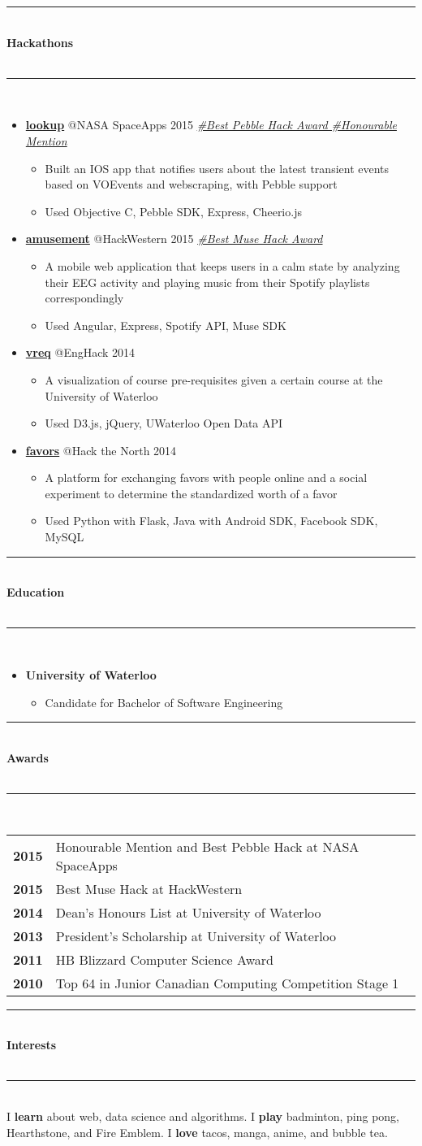 \documentclass[10pt]{article}
\makeatletter
\newcommand{\cvsectiontitle}[1]{%
	\rule{\linewidth}{0.2mm}\\%
		{\large\indent\textbf{#1}}\\%
	\\[-6.5mm]\rule{\linewidth}{0.2mm}\\[2mm]%
	}
\newcommand{\cvhackathonproject}[4]{\href{#2}{\textbf{#1}} @{#3} \color{BrickRed}\textit{#4} \color{Black}}
\newcommand{\cveducation}[2]{\textbf{#1} \hspace{\stretch{3}}{#2}}
\newcommand{\cvaward}[2]{\textbf{#1} & {#2}}
\newcommand{\cvsublevel}[1]{\begin{itemize}[leftmargin=0.5cm] #1\end{itemize}}
\newcommand{\cvsubbullet}[1]{\vspace{-1mm}\item #1}
\makeatother
\begin{document}
\cvsectiontitle{Hackathons}
\vspace{-0.8cm}
\begin{itemize}[leftmargin=0.5cm]
\item \cvhackathonproject{lookup}{https://github.com/Clemmy/lookup}{NASA SpaceApps 2015}{\href{https://twitter.com/SpaceAppsTO/status/587444439276191744}{\#Best Pebble Hack Award \#Honourable Mention}}\cvsublevel{
	\cvsubbullet{Built an IOS app that notifies users about the latest transient events based on VOEvents and webscraping, with Pebble support}
	\cvsubbullet{Used Objective C, Pebble SDK, Express, Cheerio.js}
}
\item \cvhackathonproject{amusement}{https://github.com/Clemmy/amusement}{HackWestern 2015}{\href{http://challengepost.com/software/amusement-um9im}{\#Best Muse Hack Award}}\cvsublevel{
	\cvsubbullet{A mobile web application that keeps users in a calm state by analyzing their EEG activity and playing music from their Spotify playlists correspondingly}
	\cvsubbullet{Used Angular, Express, Spotify API, Muse SDK}
}
\item \cvhackathonproject{vreq}{https://github.com/jasonf7/VReq}{EngHack 2014}{}\cvsublevel{
	\cvsubbullet{A visualization of course pre-requisites given a certain course at the University of Waterloo}
	\cvsubbullet{Used D3.js, jQuery, UWaterloo Open Data API}
}
\item \cvhackathonproject{favors}{https://github.com/raywan/favors}{Hack the North 2014}{}\cvsublevel{
	\cvsubbullet{A platform for exchanging favors with people online and a social experiment to determine the standardized worth of a favor}
	\cvsubbullet{Used Python with Flask, Java with Android SDK, Facebook SDK, MySQL}
}
\end{itemize}

\vspace{-2.5mm}
\cvsectiontitle{Education}
\vspace{-0.8cm}
\begin{itemize}[leftmargin=0.5cm]
\item \cveducation{University of Waterloo}{September 2013 - May 2018}\cvsublevel{
	\cvsubbullet{Candidate for Bachelor of Software Engineering}
}
\end{itemize}

\vspace{-2.5mm}
\cvsectiontitle{Awards}
\begin{tabular}{ c l }
	\cvaward{2015}{Honourable Mention and Best Pebble Hack at NASA SpaceApps} \\
	\cvaward{2015}{Best Muse Hack at HackWestern} \\
	\cvaward{2014}{Dean's Honours List at University of Waterloo} \\
	\cvaward{2013}{President's Scholarship at University of Waterloo} \\
	\cvaward{2011}{HB Blizzard Computer Science Award} \\
	\cvaward{2010}{Top 64 in Junior Canadian Computing Competition Stage 1}
\end{tabular}

\vspace{2mm}
\cvsectiontitle{Interests}
I \textbf{learn} about web, data science and algorithms.
I \textbf{play} badminton, ping pong, Hearthstone, and Fire Emblem.
I \textbf{love} tacos, manga, anime, and bubble tea.
\end{document}
